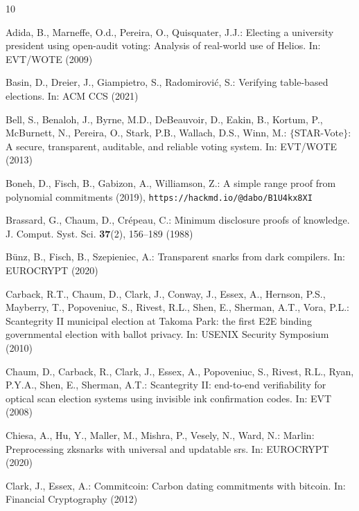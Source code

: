 \documentclass[runningheads]{llncs}
\begin{document}
\begin{thebibliography}{10}
\providecommand{\url}[1]{\texttt{#1}}
\providecommand{\urlprefix}{URL }
\providecommand{\doi}[1]{https://doi.org/#1}

Adida, B., Marneffe, O.d., Pereira, O., Quisquater, J.J.: Electing a university
  president using open-audit voting: Analysis of real-world use of {H}elios.
  In: EVT/WOTE (2009)

Basin, D., Dreier, J., Giampietro, S., Radomirovi{\'c}, S.: Verifying
  table-based elections. In: ACM CCS (2021)

Bell, S., Benaloh, J., Byrne, M.D., DeBeauvoir, D., Eakin, B., Kortum, P.,
  McBurnett, N., Pereira, O., Stark, P.B., Wallach, D.S., Winn, M.:
  $\{$STAR-Vote$\}$: A secure, transparent, auditable, and reliable voting
  system. In: EVT/WOTE (2013)

Boneh, D., Fisch, B., Gabizon, A., Williamson, Z.: A simple range proof from
  polynomial commitments (2019), \url{https://hackmd.io/@dabo/B1U4kx8XI}

Brassard, G., Chaum, D., Cr\'{e}peau, C.: Minimum disclosure proofs of
  knowledge. J. Comput. Syst. Sci.  \textbf{37}(2),  156--189 (1988)

B{\"u}nz, B., Fisch, B., Szepieniec, A.: Transparent snarks from dark
  compilers. In: EUROCRYPT (2020)

Carback, R.T., Chaum, D., Clark, J., Conway, J., Essex, A., Hernson, P.S.,
  Mayberry, T., Popoveniuc, S., Rivest, R.L., Shen, E., Sherman, A.T., Vora,
  P.L.: Scantegrity {II} municipal election at {T}akoma {P}ark: the first {E2E}
  binding governmental election with ballot privacy. In: USENIX Security
  Symposium (2010)

Chaum, D., Carback, R., Clark, J., Essex, A., Popoveniuc, S., Rivest, R.L.,
  Ryan, P.Y.A., Shen, E., Sherman, A.T.: Scantegrity {II}: end-to-end
  verifiability for optical scan election systems using invisible ink
  confirmation codes. In: EVT (2008)

Chiesa, A., Hu, Y., Maller, M., Mishra, P., Vesely, N., Ward, N.: Marlin:
  Preprocessing zksnarks with universal and updatable srs. In: EUROCRYPT (2020)

Clark, J., Essex, A.: Commitcoin: Carbon dating commitments with bitcoin. In:
  Financial Cryptography (2012)


\end{thebibliography}
\end{document}
